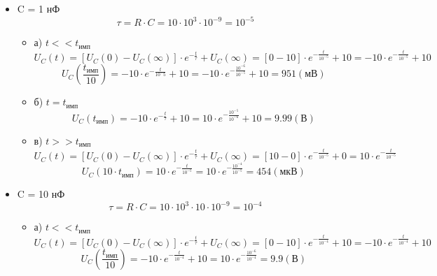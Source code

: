 \begin{itemize}
\item C = 1 нФ\\
\begin{equation}
		\tau = R \cdot C = 10 \cdot 10^3 \cdot 10^{-9} = 10^{-5}
	\end{equation}
\begin{itemize}
\item[] а) $t << t_\text{имп}$\\
	\begin{equation}
		U_C(t) = [U_C(0) - U_C(\infty)] \cdot e^{-\frac{t}{\tau}} + U_C(\infty) = [0 - 10] \cdot e^{-\frac{t}{10^{-5}}} + 10 = -10 \cdot e^{-\frac{t}{10^{-5}}} + 10
	\end{equation}
	\begin{equation}
		U_C(\frac{t_\text{имп}}{10}) = -10 \cdot e^{-\frac{t}{10^-5}} + 10 = -10 \cdot e^{-\frac{10^{-6}}{10^{-5}}} + 10 = 951 (\text{мВ})
	\end{equation}

\item[] б) $t = t_\text{имп}$\\
	\begin{equation}
		U_C(t_\text{имп}) = -10 \cdot e^{-\frac{t}{\tau}} + 10 = 10 \cdot e^{-\frac{10^{-5}}{10^{-6}}} + 10 = 9.99 (\text{В})
	\end{equation}
	
\item[] в) $t >> t_\text{имп}$\\
	\begin{equation}
		U_C(t) = [U_C(0) - U_C(\infty)] \cdot e^{-\frac{t}{\tau}} + U_C(\infty) = [10 - 0] \cdot e^{-\frac{t}{10^{-5}}} + 0 = 10 \cdot e^{-\frac{t}{10^{-5}}}
	\end{equation}
	\begin{equation}
		U_C(10 \cdot t_\text{имп}) = 10 \cdot e^{-\frac{t}{10^{-5}}} = 10 \cdot e^{-\frac{10^{-4}}{10^{-5}}} = 454 (\text{мкВ})
	\end{equation}
\end{itemize}

\item C = 10 нФ\\
\begin{equation}
		\tau = R \cdot C = 10 \cdot 10^3 \cdot 10 \cdot 10^{-9} = 10^{-4}
\end{equation}
\begin{itemize}
\item[] а) $t << t_\text{имп}$\\
	\begin{equation}
		U_C(t) = [U_C(0) - U_C(\infty)] \cdot e^{-\frac{t}{\tau}} + U_C(\infty) = [0 - 10] \cdot e^{-\frac{t}{10^{-4}}} + 10 = -10 \cdot e^{-\frac{t}{10^{-4}}} + 10
	\end{equation}
	\begin{equation}
		U_C(\frac{t_\text{имп}}{10}) = -10 \cdot e^{-\frac{t}{10^{-4}}} + 10 = 10 \cdot e^{-\frac{10^{-6}}{10^{-4}}} = 9.9 (\text{В})
	\end{equation}


\end{itemize}
\end{itemize}
